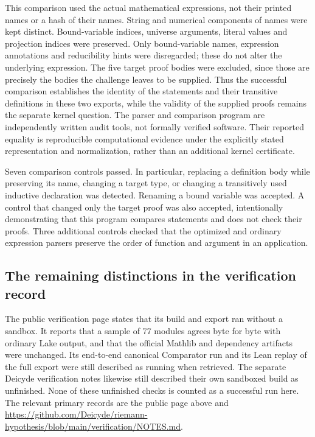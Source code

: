 \documentclass[11pt,a4paper]{article}
\theoremstyle{remark}
\begin{document}
This comparison used the actual mathematical expressions, not their printed
names or a hash of their names.  String and numerical components of names
were kept distinct.  Bound-variable indices, universe arguments, literal
values and projection indices were preserved.  Only bound-variable names,
expression annotations and reducibility hints were disregarded; these do
not alter the underlying expression.  The five target proof bodies were
excluded, since those are precisely the bodies the challenge leaves to be
supplied.  Thus the successful comparison establishes the identity of the
statements and their transitive definitions in these two exports, while the
validity of the supplied proofs remains the separate kernel question.
The parser and comparison program are independently written audit tools,
not formally verified software. Their reported equality is reproducible
computational evidence under the explicitly stated representation and
normalization, rather than an additional kernel certificate.

Seven comparison controls passed.  In particular, replacing a definition
body while preserving its name, changing a target type, or changing a
transitively used inductive declaration was detected.  Renaming a bound
variable was accepted.  A control that changed only the target proof was
also accepted, intentionally demonstrating that this program compares
statements and does not check their proofs.  Three additional controls
checked that the optimized and ordinary expression parsers preserve the
order of function and argument in an application.

\subsection{The remaining distinctions in the verification record}

The public verification page states that its build and export ran without a
sandbox.  It reports that a sample of 77 modules agrees byte for byte with
ordinary Lake output, and that the official Mathlib and dependency artifacts
were unchanged.  Its end-to-end canonical Comparator run and its Lean replay
of the full export were still described as running when retrieved.  The
separate Deicyde verification notes likewise still described their own
sandboxed build as unfinished.  None of these unfinished checks is counted
as a successful run here.  The relevant primary records are the public page
above and
\url{https://github.com/Deicyde/riemann-hypothesis/blob/main/verification/NOTES.md}.
\end{document}
